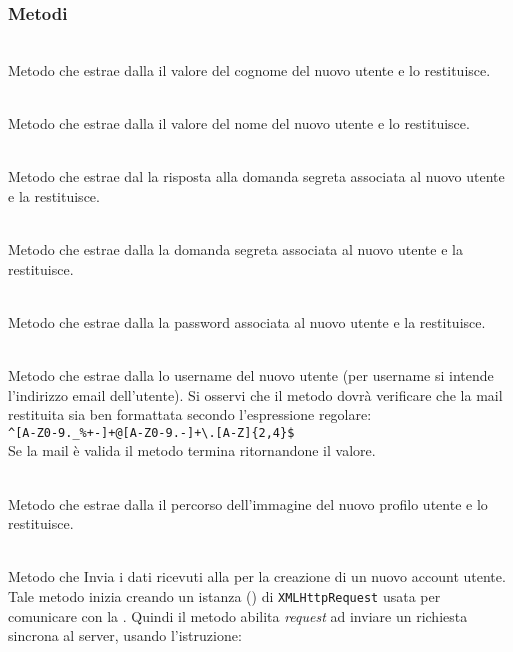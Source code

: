 \subsubsection*{Metodi}
\begin{description}

	\item{}\\
	Metodo che estrae dalla  il valore del cognome del nuovo utente e lo restituisce.
	
	\item{}\\
	Metodo che estrae dalla  il valore del nome del nuovo utente e lo restituisce.
	
	\item{}\\
	Metodo che estrae dal  la risposta alla domanda segreta associata al nuovo utente e la restituisce.	
		
	\item{}\\
	Metodo che estrae dalla  la domanda segreta associata al nuovo utente e la restituisce.
	
	\item{}\\
	Metodo che estrae dalla  la password associata al nuovo utente e la restituisce.
	
	\item{}\\
	Metodo che estrae dalla  lo username del nuovo utente (per username si intende l'indirizzo email dell'utente). Si osservi che il metodo dovrà verificare che la mail restituita sia ben formattata secondo l'espressione regolare:\\
	
	\verb|^[A-Z0-9._%+-]+@[A-Z0-9.-]+\.[A-Z]{2,4}$|
	\\
	
	Se la mail è valida il metodo termina ritornandone il valore.
	
	\item{}\\
	Metodo che estrae dalla  il percorso dell'immagine del nuovo profilo utente e lo restituisce.
	
	\item{}\\
	Metodo che Invia i dati ricevuti alla  per la creazione di un nuovo account utente. Tale metodo inizia creando un istanza () di \texttt{XMLHttpRequest} usata per comunicare con la . Quindi il metodo abilita \textit{request} ad inviare un richiesta sincrona al server, usando l'istruzione:\\
	

\end{description}
